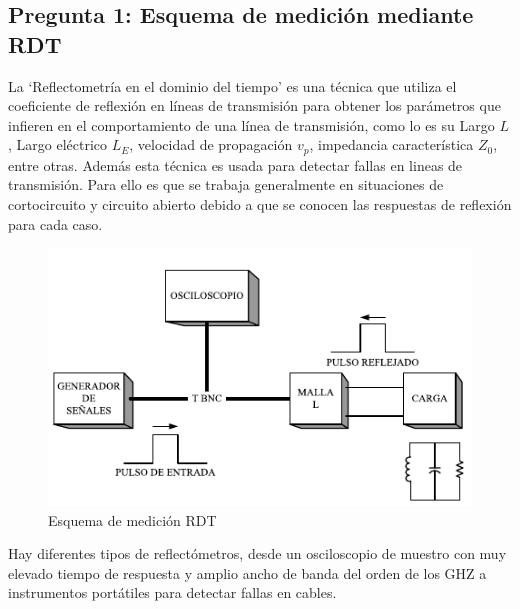 \documentclass[11pt,onecolumn]{article}
\begin{document}
\subsection*{Pregunta 1: Esquema de medición mediante RDT}

La `Reflectometría en el dominio del tiempo' es una técnica que  utiliza el coeficiente de reflexión en líneas de transmisión para obtener los parámetros que infieren en el comportamiento de una línea de transmisión, como lo es su Largo $L$, Largo eléctrico $L_{E}$, velocidad de propagación $v_{p}$, impedancia característica $Z_{0}$, entre otras. Además esta técnica es usada para detectar fallas en lineas de transmisión. Para ello es que se trabaja generalmente en situaciones de cortocircuito y circuito abierto debido a que se conocen las respuestas de reflexión para cada caso.

\begin{figure}
  \begin{center}
    \includegraphics[scale = 1]{img/schema.pdf}
  \end{center}
  \caption{Esquema de medición RDT}
  \label{fig:schrdt}
\end{figure}

Hay diferentes tipos de reflectómetros, desde un osciloscopio de 
muestro con muy elevado tiempo de respuesta y amplio ancho de banda del orden de los 
GHZ a instrumentos portátiles para detectar fallas en cables. 
\end{document}

